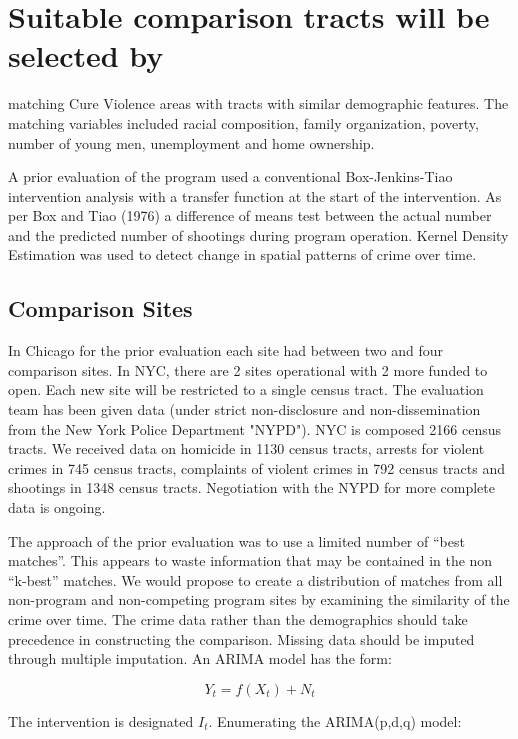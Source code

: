 \documentclass[11pt]{article}
\begin{document}
\section{Suitable comparison tracts will be selected by}
\label{sec-4}
matching Cure Violence areas with tracts with similar demographic
features. The matching variables included racial composition, family
organization, poverty, number of young men, unemployment and home
ownership.

A prior evaluation of the program used a conventional Box-Jenkins-Tiao
intervention analysis with a transfer function at the start of the
intervention.  As per Box and Tiao (1976) a difference of means test
between the actual number and the predicted number of shootings during
program operation.  Kernel Density Estimation was used to detect
change in spatial patterns of crime over time.

\subsection{Comparison Sites}
\label{sec-4-1}

In Chicago for the prior evaluation each site had between two and four
comparison sites. In NYC, there are 2 sites operational with 2 more
funded to open.  Each new site will be restricted to a single census
tract. The evaluation team has been given data (under strict
non-disclosure and non-dissemination from the New York Police
Department "NYPD").  NYC is composed 2166 census tracts.  We received
data on homicide in 1130 census tracts, arrests for violent crimes in
745 census tracts, complaints of violent crimes in 792 census tracts
and shootings in 1348 census tracts. Negotiation with the NYPD for
more complete data is ongoing.

The approach of the prior evaluation was to use a limited number of
``best matches''.  This appears to waste information that may be
contained in the non ``k-best'' matches.  We would propose to create a
distribution of matches from all non-program and non-competing program
sites by examining the similarity of the crime over time.  The crime
data rather than the demographics should take precedence in
constructing the comparison.  Missing data should be imputed through
multiple imputation.  An ARIMA model has the form:

\begin{equation}
Y_t=f(X_t)+N_t
\end{equation}

The intervention is designated \( I_t \).  Enumerating the ARIMA(p,d,q) model:
\end{document}
